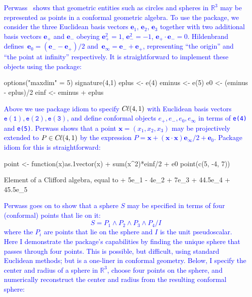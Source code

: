 \documentclass{birkjour}
\theoremstyle{definition}
\theoremstyle{remark}
\numberwithin{equation}{section}
\newcommand{\cl}{C \kern -0.1em \ell}  %
\newcommand{\einf}{\mathbf{e}_\infty}
\newcommand{\ezero}{\mathbf{e}_0}
\newcommand{\bx}{\mathbf{x}}
\begin{document}
\textcolor{blue}{
Perwass~\cite{perwass2009} shows that geometric entities such as
circles and spheres in $\mathbb{R}^3$ may be represented as points in
a conformal geometric algebra.  To use the package, we consider the
three Euclidean basis vectors $\mathbf{e}_1$, $\mathbf{e}_2$,
$\mathbf{e}_3$ together with two additional basis vectors
$\mathbf{e}_+$ and $\mathbf{e}_-$ obeying $\mathbf{e}_+^2=1$,
$\mathbf{e}_-^2=-1$, $\mathbf{e}_+\cdot\mathbf{e}_-=0$.
Hildenbrand~\cite{hildenbrand2013}
defines~$\ezero=\left(\mathbf{e}_--\mathbf{e}_+\right)/2$
and~$\einf=\mathbf{e}_- +\mathbf{e}_+$, representing ``the origin''
and ``the point at infinity'' respectively.  It is straightforward to
implement these objects using the package:}
\begin{Schunk}
\begin{Sinput}
options("maxdim" = 5)
signature(4,1)
eplus <- e(4)
eminus <- e(5)
e0 <- (eminus - eplus)/2
einf <- eminus + eplus
\end{Sinput}
\end{Schunk}
%
\textcolor{blue}{
Above we use package idiom to specify $\cl(4,1)$ with Euclidean basis
vectors $\mathtt{e(1),e(2),e(3)}$, and define conformal objects $e_+,
e_-, e_0,e_\infty$ in terms of {\tt e(4)} and {\tt e(5)}.  Perwass
shows that a point $\bx=(x_1,x_2,x_3)$ may be projectively extended to
$P\in\cl(4,1)$ by the expression $P = \bx+(\bx\cdot\bx)\einf/2
+\ezero$.  Package idiom for this is straightforward:}
\begin{Schunk}
\begin{Sinput}
point <- function(x){as.1vector(x) + sum(x^2)*einf/2 + e0}
point(c(5, -4, 7))
\end{Sinput}
\begin{Soutput}
Element of a Clifford algebra, equal to
+ 5e_1 - 4e_2 + 7e_3 + 44.5e_4 + 45.5e_5
\end{Soutput}
\end{Schunk}
%
\textcolor{blue}{
Perwass goes on to show that a sphere $S$ may be specified in terms of
four (conformal) points that lie on it:
%
\begin{equation}
  S = P_1\wedge P_2\wedge P_3\wedge P_4/ I
\end{equation}
%
where the $P_i$ are points that lie on the sphere and $I$ is the unit
pseudoscalar.  Here I demonstrate the package's capabilities by
finding the unique sphere that passes through four points.  This is
possible, but difficult, using standard Euclidean methods; but is a
one-liner in conformal geometry.  Below, I specify the center and
radius of a sphere in $\mathbb{R}^3$, choose four points on the
sphere, and numerically reconstruct the center and radius from the
resulting conformal sphere:}
\end{document}
